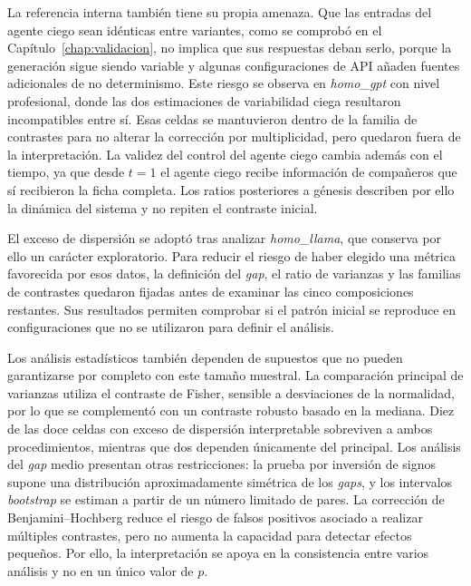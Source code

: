 La referencia interna también tiene su propia amenaza. Que las entradas del agente ciego sean idénticas entre variantes, como se comprobó en el Capítulo~\ref{chap:validacion}, no implica que sus respuestas deban serlo, porque la generación sigue siendo variable y algunas configuraciones de API añaden fuentes adicionales de no determinismo. Este riesgo se observa en \textit{homo\_gpt} con nivel profesional, donde las dos estimaciones de variabilidad ciega resultaron incompatibles entre sí. Esas celdas se mantuvieron dentro de la familia de contrastes para no alterar la corrección por multiplicidad, pero quedaron fuera de la interpretación. La validez del control del agente ciego cambia además con el tiempo, ya que desde $t=1$ el agente ciego recibe información de compañeros que sí recibieron la ficha completa. Los ratios posteriores a génesis describen por ello la dinámica del sistema y no repiten el contraste inicial.

El exceso de dispersión se adoptó tras analizar \textit{homo\_llama}, que conserva por ello un carácter exploratorio. Para reducir el riesgo de haber elegido una métrica favorecida por esos datos, la definición del \textit{gap}, el ratio de varianzas y las familias de contrastes quedaron fijadas antes de examinar las cinco composiciones restantes. Sus resultados permiten comprobar si el patrón inicial se reproduce en configuraciones que no se utilizaron para definir el análisis.

Los análisis estadísticos también dependen de supuestos que no pueden garantizarse por completo con este tamaño muestral. La comparación principal de varianzas utiliza el contraste de Fisher, sensible a desviaciones de la normalidad, por lo que se complementó con un contraste robusto basado en la mediana. Diez de las doce celdas con exceso de dispersión interpretable sobreviven a ambos procedimientos, mientras que dos dependen únicamente del principal. Los análisis del \textit{gap} medio presentan otras restricciones: la prueba por inversión de signos supone una distribución aproximadamente simétrica de los \textit{gaps}, y los intervalos \textit{bootstrap} se estiman a partir de un número limitado de pares. La corrección de Benjamini--Hochberg reduce el riesgo de falsos positivos asociado a realizar múltiples contrastes, pero no aumenta la capacidad para detectar efectos pequeños. Por ello, la interpretación se apoya en la consistencia entre varios análisis y no en un único valor de $p$.


